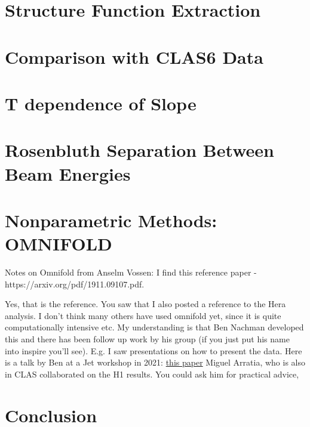 \section{Structure Function Extraction}
\section{Comparison with CLAS6 Data}
\section{T dependence of Slope}

\section{Rosenbluth Separation Between Beam Energies}
\section{Nonparametric Methods: OMNIFOLD}
Notes on Omnifold from Anselm Vossen:
I find this reference paper - https://arxiv.org/pdf/1911.09107.pdf.




Yes, that is the reference. You saw that I also posted a reference to the Hera analysis. I don’t think many others have used omnifold yet, since it is quite computationally intensive etc.
My understanding is that Ben Nachman developed this and there has been follow up work by his group (if you just put his name into inspire you’ll see). E.g. I saw presentations on how to present the data. Here is a talk by Ben at a Jet workshop in 2021: \href{https://indico.bnl.gov/event/10555/contributions/54721/attachments/37368/61570/H1Measurement_EICWorkshopSeptember2021.pdf}{this paper}
 Miguel Arratia, who is also in CLAS collaborated on the H1 results. You could ask him for practical advice,




\section{Conclusion}